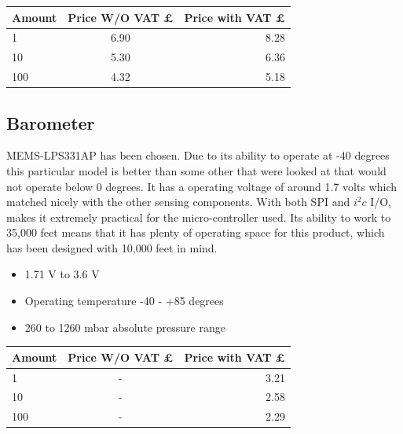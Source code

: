 \documentclass{report}
\begin{document}
\begin{center}
  \begin{tabular}{ | l | c | r |}
    \hline
    Amount & Price W/O VAT £ & Price with VAT £ \\ \hline
    1 & 6.90 & 8.28 \\ \hline
    10 & 5.30 & 6.36 \\ \hline
    100 & 4.32 & 5.18 \\ \hline
	\end{tabular}
\end{center}

\subsection{Barometer}
MEMS-LPS331AP has been chosen. Due to its ability to operate at -40 degrees this particular model is better than some other that were looked at that would not operate below 0 degrees. It has a operating voltage of around 1.7 volts which matched nicely with the other sensing components. With both SPI and $i^2c$ I/O, makes it extremely practical for the micro-controller used. Its ability to work to 35,000 feet means that it has plenty of operating space for this product, which has been designed with 10,000 feet in mind.

\begin{itemize}
\item 1.71 V to 3.6 V
\item Operating temperature -40 - +85 degrees 
\item 260 to 1260 mbar absolute pressure range
\end{itemize}

\begin{center}
  \begin{tabular}{ | l | c | r |}
    \hline
    Amount & Price W/O VAT £ & Price with VAT £ \\ \hline
    1 & - & 3.21 \\ \hline
    10 & - & 2.58 \\ \hline
    100 & - & 2.29 \\ \hline
	\end{tabular}
\end{center}
\end{document}
